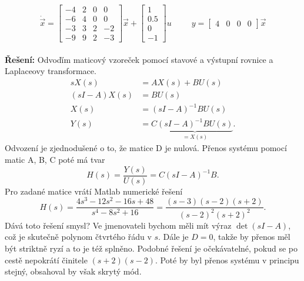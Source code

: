 \documentclass[twoside]{article}
\begin{document}
\begin{equation*}
	\dot{\vec{x}} = \begin{bmatrix}
		-4 & 2 & 0 & 0 \\
		-6 & 4 & 0 & 0 \\
		-3 & 3 & 2 & -2 \\
		-9 & 9 & 2 & -3
	\end{bmatrix} \vec{x} + \begin{bmatrix}
		1 \\
		0.5 \\
	0 \\
	-1
\end{bmatrix} u ~~~~~~~~~~~
y = \begin{bmatrix}
	4 & 0 & 0 & 0
\end{bmatrix} \vec{x}
\end{equation*} \\
\textbf{Řešení:} Odvoďím maticový vzoreček pomocí stavové a výstupní rovnice a Laplaceovy transformace.
\begin{equation*}
	\begin{split}
		sX(s) &= AX(s) + B U(s) \\
		(sI - A) X(s) &= BU(s) \\
		X(s) &= (sI - A)^{-1} B U(s) \\
		Y(s) &= C \underbrace{(sI - A)^{-1} B U(s)}_{=X(s)}.
	\end{split}
\end{equation*}
Odvození je zjednodušené o to, že matice D je nulová. Přenos systému pomocí matic A, B, C poté má tvar
\begin{equation*}
	H(s) = \frac{Y(s)}{U(s)} = C(sI-A)^{-1} B.
\end{equation*}
Pro zadané matice vrátí Matlab numerické řešení
\begin{equation*}
	H(s) = \frac{4 s^3 - 12 s^2 - 16s + 48}{s^4 - 8 s^2 + 16} = \frac{(s-3)(s-2)(s+2)}{(s-2)^2(s+2)^2}.
\end{equation*}
Dává toto řešení smysl? Ve jmenovateli bychom měli mít výraz $ \det(sI - A)$, což je skutečně polynom čtvrtého
řádu v $s$. Dále je $D = 0$, takže by přenos měl být striktně ryzí a to je též splněno. Podobné řešení je očekávatelné,
pokud se po cestě nepokrátí činitele $(s+2)(s-2)$. Poté by byl přenos systému v principu stejný, obsahoval by však skrytý mód.
\end{document}
